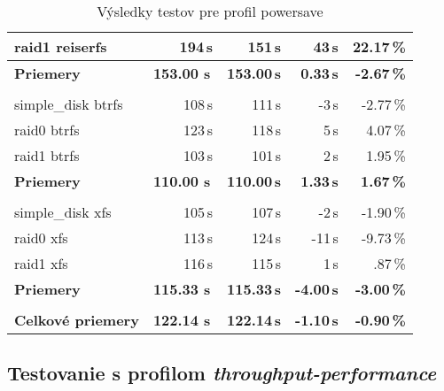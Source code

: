 \begin{table}[H]
\begin{center}
\begin{tabular}{|l|r r r r|}
    raid1 reiserfs & 194\,s & 151\,s & 43\,s & 22.17\,\% \\
    \hline
    \textbf{Priemery} & \textbf{153.00 s}\,& \textbf{153.00\,s} & \textbf{0.33\,s} & \textbf{-2.67\,\%} \\
    \hline & \\[-1em]\hline
    simple\_disk btrfs & 108\,s & 111\,s & -3\,s & -2.77\,\% \\
    raid0 btrfs & 123\,s & 118\,s & 5\,s & 4.07\,\% \\
    raid1 btrfs & 103\,s & 101\,s & 2\,s & 1.95\,\% \\
    \hline
    \textbf{Priemery} & \textbf{110.00 s}\,& \textbf{110.00\,s} & \textbf{1.33\,s} & \textbf{1.67\,\%} \\
    \hline & \\[-1em]\hline
    simple\_disk xfs & 105\,s & 107\,s & -2\,s & -1.90\,\% \\
    raid0 xfs & 113\,s & 124\,s & -11\,s & -9.73\,\% \\
    raid1 xfs & 116\,s & 115\,s & 1\,s & .87\,\% \\
    \hline
    \textbf{Priemery} & \textbf{115.33 s}\,& \textbf{115.33\,s} & \textbf{-4.00\,s} & \textbf{-3.00\,\%} \\
    \hline & \\[-1em]\hline
    \textbf{Celkové priemery} & \textbf{122.14 s}\,& \textbf{122.14\,s} & \textbf{-1.10\,s} & \textbf{-0.90\,\%} \\
    \hline
\end{tabular}
\caption{Výsledky testov pre profil powersave}
\label{tab:results-xfs}
\end{center}
\end{table}

\subsection{Testovanie s profilom \emph{throughput-performance}}

